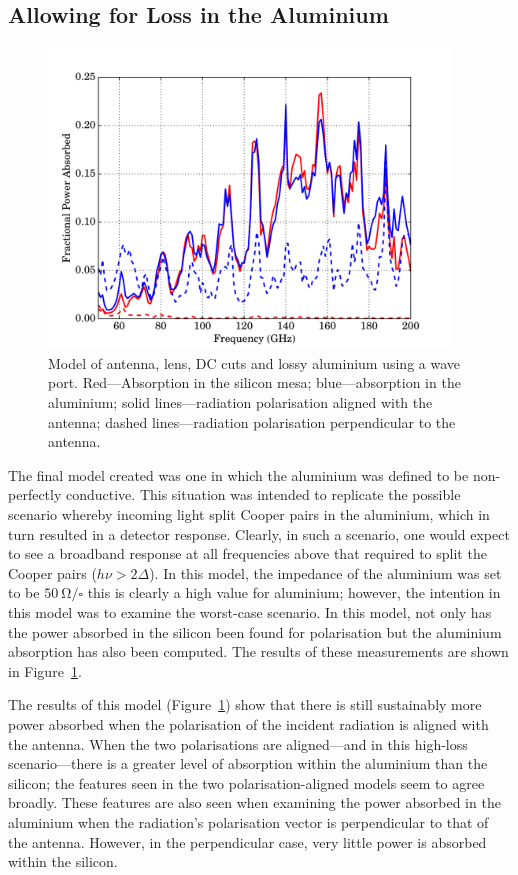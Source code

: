 \subsection{Allowing for Loss in the Aluminium}\label{ssec:antennaSims_full}
\begin{figure}[tb]
\begin{center}
\includegraphics[width = 0.95\textwidth]{figures/antennaSim_full}
\caption[Model of antenna, lens, DC cuts and lossy aluminium using a wave port]{Model of antenna, lens, DC cuts and lossy aluminium using a wave port. Red---Absorption in the silicon mesa; blue---absorption in the aluminium; solid lines---radiation polarisation aligned with the antenna; dashed lines---radiation polarisation perpendicular to the antenna.}
\label{fig:antennaSims_full}
\end{center}
\end{figure}
The final model created was one in which the aluminium was defined to be non-perfectly conductive. This situation was intended to replicate the possible scenario whereby incoming light split Cooper pairs in the aluminium, which in turn resulted in a detector response. Clearly, in such a scenario, one would expect to see a broadband response at all frequencies above that required to split the Cooper pairs ($h\nu > 2\varDelta$). In this model, the impedance of the aluminium was set to be $50~\mathrm{\Omega/\square}$ this is clearly a high value for aluminium; however, the intention in this model was to examine the worst-case scenario. In this model, not only has the power absorbed in the silicon been found for polarisation but the aluminium absorption has also been computed. The results of these measurements are shown in Figure~\ref{fig:antennaSims_full}.
\par
The results of this model (Figure~\ref{fig:antennaSims_full}) show that there is still sustainably more power absorbed when the polarisation of the incident radiation is aligned with the antenna. When the two polarisations are aligned---and in this high-loss scenario---there is a greater level of absorption within the aluminium than the silicon; the features seen in the two polarisation-aligned models seem to agree broadly. These features are also seen when examining the power absorbed in the aluminium when the radiation's polarisation vector is perpendicular to that of the antenna. However, in the perpendicular case, very little power is absorbed within the silicon.
%
